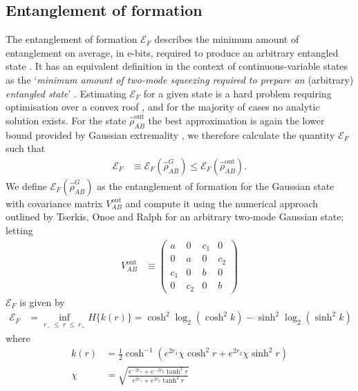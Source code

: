 \documentclass[%
 reprint,
 superscriptaddress,
 amsmath,
 amssymb,
 aps,
 pra,
]{revtex4-2}
\begin{document}
\begin{widetext}
\subsection{Entanglement of formation}
\label{app:ent:eof}
The entanglement of formation $\mathcal{E}_F$ describes the minimum amount of entanglement on average, in e-bits, required to produce an arbitrary entangled state \cite{bennett_mixed-state_1996}. It has an equivalent definition in the context of continuous-variable states as the `\textit{minimum amount of two-mode squeezing required to prepare an} (arbitrary) \textit{entangled state}' \cite{tserkis_quantifying_2017}. Estimating $\mathcal{E}_F$ for a given state is a hard problem requiring optimisation over a convex roof \cite{tserkis_quantifying_2019}, and for the majority of cases no analytic solution exists. For the state $\hat \rho_{AB}^\mathrm{out}$ the best approximation is again the lower bound provided by Gaussian extremality \cite{wolf_extremality_2006}, we therefore calculate the quantity $\mathcal{E}_F$ such that
\begin{align}
    \mathcal{E}_F &\equiv \mathcal{E}_F(\hat \rho_{AB}^G) \leq \mathcal{E}_F(\hat \rho_{AB}^\mathrm{out}).
\end{align}
We define $\mathcal{E}_F(\hat \rho_{AB}^G)$ as the entanglement of formation for the Gaussian state with covariance matrix $V_{AB}^\mathrm{out}$ and compute it using the numerical approach outlined by Tserkis, Onoe and Ralph \cite{tserkis_quantifying_2019} for an arbitrary two-mode Gaussian state; letting
\begin{align}
    V_{AB}^\mathrm{out} &\equiv \begin{pmatrix}
        a & 0 & c_1 & 0 \\
        0 & a & 0 & c_2 \\
        c_1 & 0 & b & 0 \\
        0 & c_2 & 0 & b
    \end{pmatrix}
\end{align}
$\mathcal{E}_F$ is given by
\begin{align}
    \mathcal{E}_F &= \inf_{r_{-} \ \leq \ r \ \leq \ r_+} H\{k(r)\} = \cosh^2 \log_2(\cosh^2k) - \sinh^2 \log_2(\sinh^2k)
\end{align}
where
\begin{align}
    k(r) &= \frac{1}{2} \cosh^{-1} \left( e^{2r_1} \chi \cosh^2 r + e^{2r_2} \chi \sinh^2 r \right) \\
    \chi &= \sqrt{\frac{e^{-2r_1} + e^{-2r_2} \tanh^2 r}{e^{2r_1} + e^{2r_2} \tanh^2 r}}
\end{align}

\end{widetext}
\end{document}
